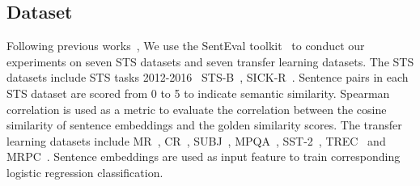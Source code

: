 \documentclass{article}
\begin{document}
\subsection{Dataset}
Following previous works~\cite{gao2021simcse,  jiang2022promptbert},
We use the SentEval toolkit~\cite{conneau2018senteval} to conduct our experiments on seven STS datasets and seven transfer learning datasets.
The STS datasets include STS tasks 2012-2016~\cite{agirre2012semeval, agirre2013sem, agirre2014semeval, agirre2015semeval, agirre2016semeval} STS-B~\cite{cer2017semeval}, SICK-R~\cite{marelli2014sick}. Sentence pairs in each STS dataset are scored from 0 to 5 to indicate semantic similarity.
Spearman correlation is used as a metric to evaluate the correlation between the cosine similarity of sentence embeddings  and the golden similarity scores.
The transfer learning datasets include MR~\cite{pang2005seeing_mr}, CR~\cite{hu2004mining_cr}, SUBJ~\cite{pang2004sentimental_subj}, MPQA~\cite{wiebe2005annotating_mpqa}, SST-2~\cite{socher2013recursive_sst-2}, TREC~\cite{voorhees2000building_trec} and MRPC~\cite{mrpc2005}.
Sentence embeddings are used as input feature to train corresponding logistic regression classification.
\end{document}

